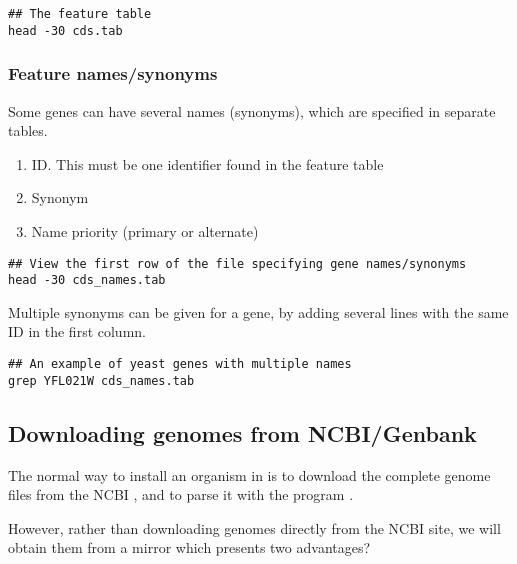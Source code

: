 \begin{footnotesize}
\begin{verbatim}
## The feature table
head -30 cds.tab
\end{verbatim}
\end{footnotesize}


\subsubsection{Feature names/synonyms}

Some genes can have several names (synonyms), which are specified in
separate tables.

\begin{enumerate}
\item ID. This must be one identifier found in the feature table
\item Synonym
\item Name priority (primary or alternate)
\end{enumerate}


\begin{footnotesize}
\begin{verbatim}
## View the first row of the file specifying gene names/synonyms
head -30 cds_names.tab
\end{verbatim}
\end{footnotesize}


Multiple synonyms can be given for a gene, by adding several lines with
the same ID in the first column.

\begin{footnotesize}
\begin{verbatim}
## An example of yeast genes with multiple names
grep YFL021W cds_names.tab 
\end{verbatim}
\end{footnotesize}



\subsection{Downloading genomes from NCBI/Genbank}

The normal way to install an organism in \RSAT is to download the
complete genome files from the NCBI
, and to parse it with the
program .

However, rather than downloading genomes directly from the NCBI site,
we will obtain them from a mirror
 which presents two
advantages?

